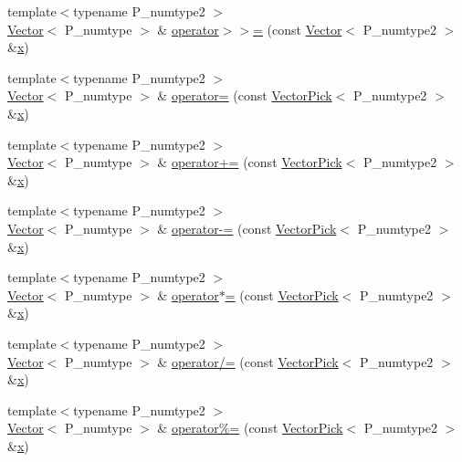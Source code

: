 \begin{DoxyCompactItemize}
\item 
{\footnotesize template$<$typename P\+\_\+numtype2 $>$ }\\\hyperlink{classVector}{Vector}$<$ P\+\_\+numtype $>$ \& \hyperlink{classVector_af91fe9061b44adac7d044f7568bd8509}{operator$>$$>$=} (const \hyperlink{classVector}{Vector}$<$ P\+\_\+numtype2 $>$ \&\hyperlink{vecnorm1_8cc_ac73eed9e41ec09d58f112f06c2d6cb63}{x})
\item 
{\footnotesize template$<$typename P\+\_\+numtype2 $>$ }\\\hyperlink{classVector}{Vector}$<$ P\+\_\+numtype $>$ \& \hyperlink{classVector_ab76677ca2fb3be40455f21df060ec0c8}{operator=} (const \hyperlink{classVectorPick}{Vector\+Pick}$<$ P\+\_\+numtype2 $>$ \&\hyperlink{vecnorm1_8cc_ac73eed9e41ec09d58f112f06c2d6cb63}{x})
\item 
{\footnotesize template$<$typename P\+\_\+numtype2 $>$ }\\\hyperlink{classVector}{Vector}$<$ P\+\_\+numtype $>$ \& \hyperlink{classVector_afa3177c7f241cb8f6fba5d3ce76ec22a}{operator+=} (const \hyperlink{classVectorPick}{Vector\+Pick}$<$ P\+\_\+numtype2 $>$ \&\hyperlink{vecnorm1_8cc_ac73eed9e41ec09d58f112f06c2d6cb63}{x})
\item 
{\footnotesize template$<$typename P\+\_\+numtype2 $>$ }\\\hyperlink{classVector}{Vector}$<$ P\+\_\+numtype $>$ \& \hyperlink{classVector_a4fd9d92f4c03e5dd14266ebcff1c78ea}{operator-\/=} (const \hyperlink{classVectorPick}{Vector\+Pick}$<$ P\+\_\+numtype2 $>$ \&\hyperlink{vecnorm1_8cc_ac73eed9e41ec09d58f112f06c2d6cb63}{x})
\item 
{\footnotesize template$<$typename P\+\_\+numtype2 $>$ }\\\hyperlink{classVector}{Vector}$<$ P\+\_\+numtype $>$ \& \hyperlink{classVector_a8703bb5803e5ee223ef99c562fb88c94}{operator$\ast$=} (const \hyperlink{classVectorPick}{Vector\+Pick}$<$ P\+\_\+numtype2 $>$ \&\hyperlink{vecnorm1_8cc_ac73eed9e41ec09d58f112f06c2d6cb63}{x})
\item 
{\footnotesize template$<$typename P\+\_\+numtype2 $>$ }\\\hyperlink{classVector}{Vector}$<$ P\+\_\+numtype $>$ \& \hyperlink{classVector_a787d31072708181912def6b9b4aa12f1}{operator/=} (const \hyperlink{classVectorPick}{Vector\+Pick}$<$ P\+\_\+numtype2 $>$ \&\hyperlink{vecnorm1_8cc_ac73eed9e41ec09d58f112f06c2d6cb63}{x})
\item 
{\footnotesize template$<$typename P\+\_\+numtype2 $>$ }\\\hyperlink{classVector}{Vector}$<$ P\+\_\+numtype $>$ \& \hyperlink{classVector_acd06429732019f90c1cb13269e23f540}{operator\%=} (const \hyperlink{classVectorPick}{Vector\+Pick}$<$ P\+\_\+numtype2 $>$ \&\hyperlink{vecnorm1_8cc_ac73eed9e41ec09d58f112f06c2d6cb63}{x})

\end{DoxyCompactItemize}
